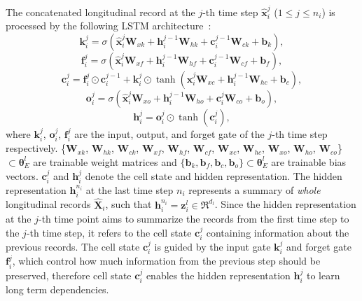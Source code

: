 The concatenated longitudinal record at the $j$-th time step $\hat{\mathbf{x}}_i^j$ ($1 \leq j \leq n_i$) is processed by the following LSTM architecture~\cite{yu2019review}:
\begin{equation}
    \mathbf{k}^j_i = \sigma(\hat{\mathbf{x}}^j_i \mathbf{W}_{xk} + \mathbf{h}_i^{j-1} \mathbf{W}_{hk} + \mathbf{c}_i^{j-1} \mathbf{W}_{ck} + \mathbf{b}_k),
\end{equation}
\begin{equation}
    \mathbf{f}^j_i = \sigma(\hat{\mathbf{x}}^j_i \mathbf{W}_{xf} + \mathbf{h}^{j-1}_i \mathbf{W}_{hf} + \mathbf{c}^{j-1}_i \mathbf{W}_{cf} + \mathbf{b}_f),
\end{equation}
\begin{equation}
    \mathbf{c}^j_i = \mathbf{f}^j_i \odot \mathbf{c}^{j-1}_i + \mathbf{k}^j_i \odot \operatorname{tanh}(\hat{\mathbf{x}}_i^j \mathbf{W}_{xc} + \mathbf{h}^{j - 1}_i \mathbf{W}_{hc} + \mathbf{b}_c),
\end{equation}
\begin{equation}
    \mathbf{o}^j_i = \sigma(\hat{\mathbf{x}}_i^j \mathbf{W}_{xo} + \mathbf{h}^{j-1}_i \mathbf{W}_{ho} + \mathbf{c}^j_i \mathbf{W}_{co} + \mathbf{b}_o),
\end{equation}
\begin{equation}
    \mathbf{h}^j_i = \mathbf{o}^j_i \odot \operatorname{tanh}(\mathbf{c}^j_i),
\end{equation}
where $\mathbf{k}^j_i$, $\mathbf{o}^j_i$, $\mathbf{f}^j_i$ are the input, output, and forget gate of the $j$-th time step respectively. \{$\mathbf{W}_{xk}$, $\mathbf{W}_{hk}$, $\mathbf{W}_{ck}$, $\mathbf{W}_{xf}$, $\mathbf{W}_{hf}$, $\mathbf{W}_{cf}$, $\mathbf{W}_{xc}$, $\mathbf{W}_{hc}$, $\mathbf{W}_{xo}$, $\mathbf{W}_{ho}$, $\mathbf{W}_{co}$\} $\subset \mathbf{\theta}_{E}^l$ are trainable weight matrices and $\{\mathbf{b}_k, \mathbf{b}_f, \mathbf{b}_c, \mathbf{b}_o\} \subset \mathbf{\theta}_{E}^l$ are trainable bias vectors. $\mathbf{c}_i^j$ and $\mathbf{h}_i^j$ denote the cell state and hidden representation. The hidden representation $\mathbf{h}_i^{n_i}$ at the last time step $n_i$ represents a summary of \emph{whole} longitudinal records $\hat{\mathbf{X}}_i$, such that $\mathbf{h}_i^{n_i} = \mathbf{z}_i^l \in \Re^{d_l}$. Since the hidden representation at the $j$-th time point aims to summarize the records from the first time step to the $j$-th time step, it refers to the cell state $\mathbf{c}_i^j$ containing information about the previous records. The cell state $\mathbf{c}_i^j$ is guided by the input gate $\mathbf{k}_i^j$ and forget gate $\mathbf{f}_i^j$, which control how much information from the previous step should be preserved, therefore cell state $\mathbf{c}_i^j$ enables the hidden representation $\mathbf{h}_i^j$ to learn long term dependencies. 
